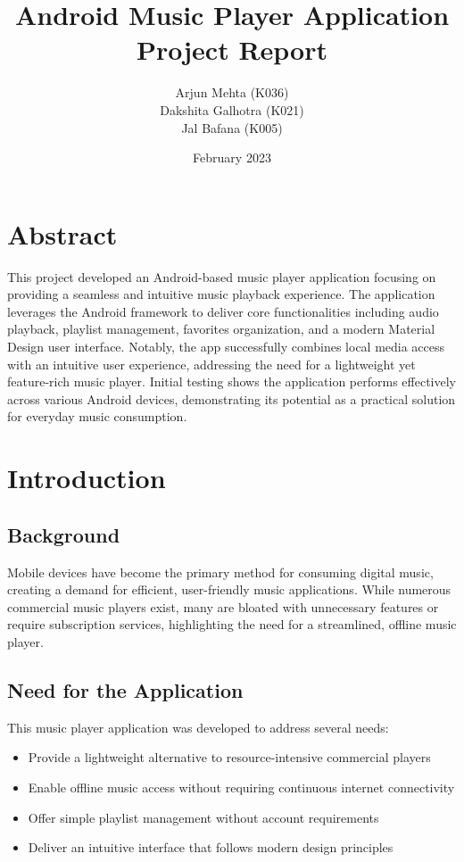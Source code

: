 \documentclass{article}
\title{\Huge \textbf{Android Music Player Application}\\
       \Large Project Report}
\author{Arjun Mehta (K036)\\
        Dakshita Galhotra (K021)\\
        Jal Bafana (K005)}
\date{February 2023}
\begin{document}
\maketitle
\thispagestyle{empty}

\newpage
\tableofcontents
\newpage

\section*{Abstract}
This project developed an Android-based music player application focusing on providing a seamless and intuitive music playback experience. The application leverages the Android framework to deliver core functionalities including audio playback, playlist management, favorites organization, and a modern Material Design user interface. Notably, the app successfully combines local media access with an intuitive user experience, addressing the need for a lightweight yet feature-rich music player. Initial testing shows the application performs effectively across various Android devices, demonstrating its potential as a practical solution for everyday music consumption.

\section{Introduction}
\subsection{Background}
Mobile devices have become the primary method for consuming digital music, creating a demand for efficient, user-friendly music applications. While numerous commercial music players exist, many are bloated with unnecessary features or require subscription services, highlighting the need for a streamlined, offline music player.

\subsection{Need for the Application}
This music player application was developed to address several needs:
\begin{itemize}
    \item Provide a lightweight alternative to resource-intensive commercial players
    \item Enable offline music access without requiring continuous internet connectivity
    \item Offer simple playlist management without account requirements
    \item Deliver an intuitive interface that follows modern design principles
\end{itemize}
\end{document}
